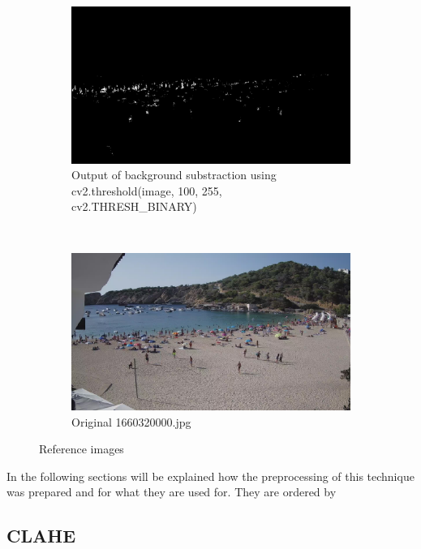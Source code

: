 \documentclass[10pt]{article}
\begin{document}
\begin{figure}[h]
    \begin{subfigure}[t]{0.5\textwidth}
        \centering
        \includegraphics[width=\textwidth]{img/bin_ex.jpg}
        \caption{Output of background substraction using cv2.threshold(image, 100, 255, cv2.THRESH\_BINARY)}
        \label{fig:y equals x}
    \end{subfigure}
    ~
    \begin{subfigure}[t]{0.5\textwidth}
        \centering
        \includegraphics[width=\textwidth]{img/or_ex.jpg}
        \caption{Original 1660320000.jpg}
        \label{fig:y equals x}
    \end{subfigure}

    \caption{Reference images}
    \label{fig: img_reference}
\end{figure}

In the following sections will be explained how the preprocessing of this technique was prepared and for what they are used for. They are ordered by    

\subsection*{CLAHE}
\end{document}
